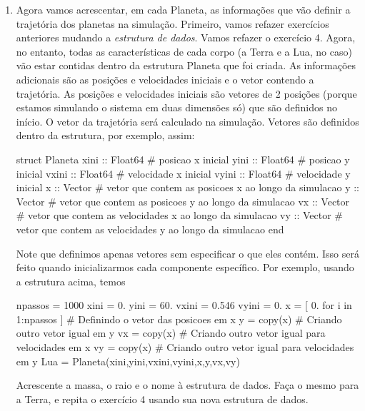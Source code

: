 \documentclass[10pt,a4paper,ssfamily]{exam}
\begin{document}
\begin{enumerate}
\item
Agora vamos acrescentar, em cada Planeta, as informações que vão definir
a trajetória dos planetas na simulação. Primeiro, vamos refazer
exercícios anteriores mudando a {\it estrutura de dados}. Vamos refazer
o exercício 4. Agora, no entanto, todas as características de cada corpo
(a Terra e a Lua, no caso) vão estar contidas dentro da estrutura
Planeta que foi criada. As informações adicionais são as posições e
velocidades iniciais e o vetor contendo a trajetória. As posições e
velocidades iniciais são vetores de 2 posições (porque estamos simulando
o sistema em duas dimensões só) que são definidos no início. O vetor da
trajetória será calculado na simulação. Vetores são definidos dentro da
estrutura, por exemplo, assim:
\begin{code}
struct Planeta
  xini :: Float64  # posicao x inicial
  yini :: Float64  # posicao y inicial
  vxini :: Float64 # velocidade x inicial
  vyini :: Float64 # velocidade y inicial
  x :: Vector{}     # vetor que contem as posicoes x ao longo da simulacao
  y :: Vector{}     # vetor que contem as posicoes y ao longo da simulacao 
  vx :: Vector{}    # vetor que contem as velocidades x ao longo da simulacao  
  vy :: Vector{}    # vetor que contem as velocidades y ao longo da simulacao   
end
\end{code}
Note que definimos apenas vetores sem especificar o que eles contém.
Isso será feito quando inicializarmos cada componente específico. Por
exemplo, usando a estrutura acima, temos 
\begin{code}
npassos = 1000
xini = 0. 
yini = 60.
vxini = 0.546 
vyini = 0.
x = [ 0. for i in 1:npassos ] # Definindo o vetor das posicoes em x
y = copy(x) # Criando outro vetor igual em y
vx = copy(x) # Criando outro vetor igual para velocidades em x
vy = copy(x) # Criando outro vetor igual para velocidades em y
Lua = Planeta(xini,yini,vxini,vyini,x,y,vx,vy)
\end{code}
Acrescente a massa, o raio e o nome à estrutura de dados. 
Faça o mesmo para a Terra, e repita o exercício 4 usando sua nova
estrutura de dados.

\end{enumerate}
\end{document}
